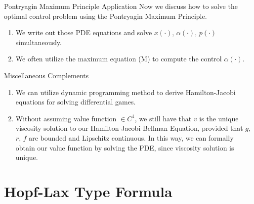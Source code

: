 \documentclass[english]{pkuslide}
\begin{document}
\begin{frame}{Pontryagin Maximum Principle} {Application}
Now we discuss how to solve the optimal control problem using the Pontryagin Maximum Principle.
\begin{enumerate}
\item We write out those PDE equations and solve $x(\cdot)$, $\alpha(\cdot)$, $p(\cdot)$ simultaneously.
\item We often utilize the maximum equation (M) to compute the control $\alpha(\cdot)$.
\end{enumerate}
\end{frame}
\begin{frame}{Miscellaneous Complements} 
\begin{enumerate}[<+->]
\item We can utilize dynamic programming method to derive Hamilton-Jacobi equations for solving differential games.
\item Without assuming value function $\in C^1$, we still have that $v$ is the unique viscosity solution to our Hamilton-Jacobi-Bellman Equation, provided that $g$, $r$, $f$ are bounded and Lipschitz continuous. In this way, we can formally obtain our value function by solving the PDE, since viscosity solution is unique.
\end{enumerate}
\end{frame}
\section{Hopf-Lax Type Formula}
	\frame{\sectionpage}
\end{document}
